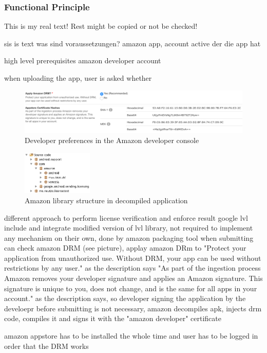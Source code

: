 \subsubsection{Functional Principle}\label{subsection:license-amazon-functional}
This is my real text! Rest might be copied or not be checked!

sis is text
was sind voraussetzungen? amazon app, account active der die app hat\newline

high level prerequisites
amazon developer account

when uploading the app, user is asked whether
\begin{figure}[h]
    \centering
    \includegraphics[width=1\textwidth]{data/amazon.png}
    \caption{Developer preferences in the Amazon developer console \cite{amazonDeveloper}}
    \label{fig:amazon}
\end{figure}

\begin{figure}[h]
    \centering
    \includegraphics[width=0.3\textwidth]{data/amazonFolder.png}
    \caption{Amazon library structure in decompiled application}
    \label{fig:amazonFolder}
\end{figure}

%
different approach to perform license verification and enforce result
google lvl include and integrate modified version of lvl library, not required to implement any mechanism on their own, done by amazon packaging tool
when submitting can check amazon DRM (see picture), applay amazon DRm to "Protect your application from unauthorized use. Without DRM, your app can be used without restrictions by any user." as the description says
"As part of the ingestion process Amazon removes your developer signature and applies an Amazon signature. This signature is unique to you, does not change, and is the same for all apps in your account."  as the description says, so developer signing the application by the develoepr before submitting is not necessary, amazon decompiles apk, injects drm code, compiles it and signs it with the "amazon developer" certificate
\cite{munteanLicense}
%

amazon appstore has to be installed the whole time and user has to be logged in order that the DRM works
